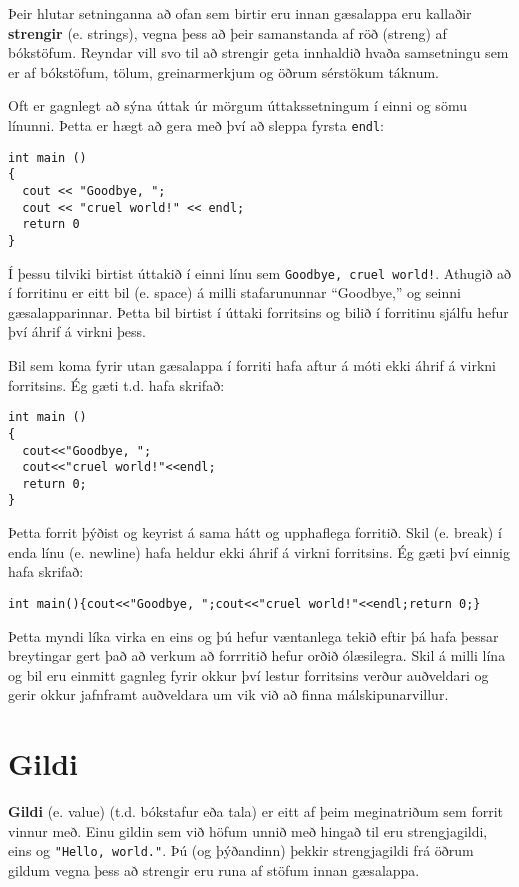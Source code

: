 
Þeir hlutar setninganna að ofan sem birtir eru innan gæsalappa eru kallaðir {\bf strengir} (e. strings),
vegna þess að þeir samanstanda af röð (streng) af bókstöfum.
Reyndar vill svo til að strengir geta innhaldið hvaða samsetningu sem er af bókstöfum, tölum, greinarmerkjum og öðrum sérstökum táknum.


Oft er gagnlegt að sýna úttak úr mörgum úttakssetningum í einni og sömu línunni.
Þetta er hægt að gera með því að sleppa fyrsta {\tt endl}:

\begin{verbatim}
int main ()
{
  cout << "Goodbye, ";
  cout << "cruel world!" << endl;
  return 0
}
\end{verbatim}
%
Í þessu tilviki birtist úttakið í einni línu sem {\tt Goodbye, cruel world!}.
Athugið að í forritinu er eitt bil (e. space) á milli stafarununnar ``Goodbye,'' og seinni gæsalapparinnar.
Þetta bil birtist í úttaki forritsins og bilið í forritinu sjálfu hefur því áhrif á virkni þess.

Bil sem koma fyrir utan gæsalappa í forriti hafa aftur á móti ekki áhrif á virkni forritsins.
Ég gæti t.d. hafa skrifað:

\begin{verbatim}
int main ()
{
  cout<<"Goodbye, ";
  cout<<"cruel world!"<<endl;
  return 0;
}
\end{verbatim}
%
Þetta forrit þýðist og keyrist á sama hátt og upphaflega forritið.
Skil (e. break) í enda línu (e. newline) hafa heldur ekki áhrif á virkni forritsins.
Ég gæti því einnig hafa skrifað:

\begin{verbatim}
int main(){cout<<"Goodbye, ";cout<<"cruel world!"<<endl;return 0;}
\end{verbatim}
%
Þetta myndi líka virka en eins og þú hefur væntanlega tekið eftir þá hafa þessar breytingar gert það að verkum að forrritið hefur orðið ólæsilegra.
Skil á milli lína og bil eru einmitt gagnleg fyrir okkur því lestur forritsins verður auðveldari og gerir okkur jafnframt auðveldara um vik við að finna málskipunarvillur.

\section{Gildi}

{\bf Gildi} (e. value) (t.d. bókstafur eða tala) er eitt af þeim meginatriðum sem forrit vinnur með.
Einu gildin sem við höfum unnið með hingað til eru strengjagildi, eins og \verb+"Hello, world."+.
Þú (og þýðandinn) þekkir strengjagildi frá öðrum gildum vegna þess að strengir eru runa af stöfum innan gæsalappa.

